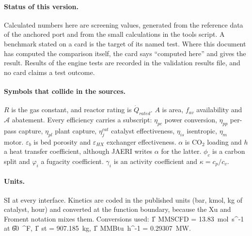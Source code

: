 \paragraph{Status of this version.} Calculated numbers here are screening values, generated from the reference data of the anchored port and from the small calculations in the tools script. A benchmark stated on a card is the target of its named test. Where this document has computed the comparison itself, the card says ``computed here'' and gives the result. Results of the engine tests are recorded in the validation results file, and no card claims a test outcome.

\paragraph{Symbols that collide in the sources.} $R$ is the gas constant, and reactor rating is $\dot Q_{rated}$. $A$ is area, $f_{av}$ availability and $\mathcal A$ abatement. Every efficiency carries a subscript: $\eta_{pc}$ power conversion, $\eta_{pp}$ per-pass capture, $\eta_{pl}$ plant capture, $\eta_j^{cat}$ catalyst effectiveness, $\eta_{is}$ isentropic, $\eta_m$ motor. $\varepsilon_b$ is bed porosity and $\varepsilon_{HX}$ exchanger effectiveness. $\alpha$ is CO$_2$ loading and $h$ a heat transfer coefficient, although JAERI writes $\alpha$ for the latter. $\phi_c$ is a carbon split and $\varphi_i$ a fugacity coefficient. $\gamma_i$ is an activity coefficient and $\kappa=c_p/c_v$.

\paragraph{Units.} SI at every interface. Kinetics are coded in the published units (bar, kmol, kg of catalyst, hour) and converted at the function boundary, because the Xu and Froment notation mixes them. Conversions used: \U{1\ MMSCFD = 13.83\ mol\ s^{-1}} at \U{60\ ^{\circ}F}, \U{1\ st = 907.185\ kg}, \U{1\ MMBtu\ h^{-1} = 0.29307\ MW}.
